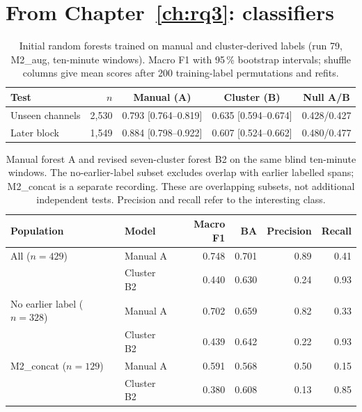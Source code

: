 \clearpage

\section*{From Chapter~\ref{ch:rq3}: classifiers}

\begin{table}[htbp]
\centering
\caption[{Initial random forests trained on manual and cluster-derived labels.}]{Initial random forests trained on manual and cluster-derived labels (run 79, M2\_aug, ten-minute windows). Macro F1 with 95\,\% bootstrap intervals; shuffle columns give mean scores after 200 training-label permutations and refits.}
\label{tab:forests}
\small
\begin{tabularx}{\textwidth}{@{}Xrccc@{}}
\toprule
\textbf{Test} & \textbf{$n$} & \textbf{Manual (A)} & \textbf{Cluster (B)} & \textbf{Null A/B}\\
\midrule
Unseen channels & 2,530 & 0.793 [0.764--0.819] & 0.635 [0.594--0.674] & 0.428/0.427\\
Later block & 1,549 & 0.884 [0.798--0.922] & 0.607 [0.524--0.662] & 0.480/0.477\\
\bottomrule
\end{tabularx}
\end{table}

\begin{table}[htbp]
\centering
\caption[{Manual forest A and seven-cluster forest B2 on blind ten-minute windows.}]{Manual forest A and revised seven-cluster forest B2 on the same blind ten-minute windows. The no-earlier-label subset excludes overlap with earlier labelled spans; M2\_concat is a separate recording. These are overlapping subsets, not additional independent tests. Precision and recall refer to the interesting class.}
\label{tab:forestblind}
\small
\begin{tabularx}{\textwidth}{@{}Xlrrrr@{}}
\toprule
\textbf{Population} & \textbf{Model} & \textbf{Macro F1} & \textbf{BA} & \textbf{Precision} & \textbf{Recall}\\
\midrule
All ($n=429$) & Manual A & 0.748 & 0.701 & 0.89 & 0.41\\
 & Cluster B2 & 0.440 & 0.630 & 0.24 & 0.93\\
\addlinespace
No earlier label ($n=328$) & Manual A & 0.702 & 0.659 & 0.82 & 0.33\\
 & Cluster B2 & 0.439 & 0.642 & 0.22 & 0.93\\
\addlinespace
M2\_concat ($n=129$) & Manual A & 0.591 & 0.568 & 0.50 & 0.15\\
 & Cluster B2 & 0.380 & 0.608 & 0.13 & 0.85\\
\bottomrule
\end{tabularx}
\end{table}

